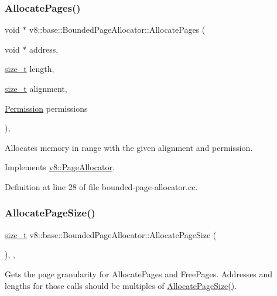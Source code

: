 \subsubsection{\texorpdfstring{Allocate\+Pages()}{AllocatePages()}}
{\footnotesize\ttfamily void $\ast$ v8\+::base\+::\+Bounded\+Page\+Allocator\+::\+Allocate\+Pages (\begin{DoxyParamCaption}\item[{void $\ast$}]{address,  }\item[{\mbox{\hyperlink{classsize__t}{size\+\_\+t}}}]{length,  }\item[{\mbox{\hyperlink{classsize__t}{size\+\_\+t}}}]{alignment,  }\item[{\mbox{\hyperlink{classv8_1_1PageAllocator_a88f74b164fe97e053259f67a95758415}{Permission}}}]{permissions }\end{DoxyParamCaption})\hspace{0.3cm}{\ttfamily [override]}, {\ttfamily [virtual]}}

Allocates memory in range with the given alignment and permission. 

Implements \mbox{\hyperlink{classv8_1_1PageAllocator_ab3a25ddd2601701f80ee67c4bf017ef7}{v8\+::\+Page\+Allocator}}.



Definition at line 28 of file bounded-\/page-\/allocator.\+cc.

\mbox{\label{classv8_1_1base_1_1BoundedPageAllocator_af7b999d6c3a3526636230bf6b7d72784}} 
\subsubsection{\texorpdfstring{Allocate\+Page\+Size()}{AllocatePageSize()}}
{\footnotesize\ttfamily \mbox{\hyperlink{classsize__t}{size\+\_\+t}} v8\+::base\+::\+Bounded\+Page\+Allocator\+::\+Allocate\+Page\+Size (\begin{DoxyParamCaption}{ }\end{DoxyParamCaption})\hspace{0.3cm}{\ttfamily [inline]}, {\ttfamily [override]}, {\ttfamily [virtual]}}

Gets the page granularity for Allocate\+Pages and Free\+Pages. Addresses and lengths for those calls should be multiples of \mbox{\hyperlink{classv8_1_1base_1_1BoundedPageAllocator_af7b999d6c3a3526636230bf6b7d72784}{Allocate\+Page\+Size()}}. 


